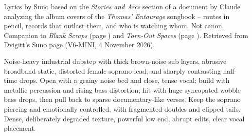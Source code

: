 
\label{sec:routes-keep-moving}
\begin{notes}
Lyrics by Suno based on the \emph{Stories and Arcs} section of a document by Claude analyzing the album covers of the \emph{Thomas' Entourage} songbook -- routes in pencil, records that outlast them, and who is watching whom. Not canon. Companion to \emph{Blank Scraps} (page \pageref{sec:blank-scraps}) and \emph{Torn-Out Spaces} (page \pageref{sec:torn-out-spaces}). Retrieved from Dvigitt's Suno page (V6-MINI, 4 November 2026).
\end{notes}
\begin{style}
Noise-heavy industrial dubstep with thick brown-noise sub layers, abrasive broadband static, distorted female soprano lead, and sharply contrasting half-time drops. Open with a grainy noise bed and close, tense vocal; build with metallic percussion and rising bass distortion; hit with huge syncopated wobble bass drops, then pull back to sparse documentary-like verses. Keep the soprano piercing and emotionally controlled, with fragmented doubles and clipped tails. Dense, deliberately degraded texture, powerful low end, abrupt edits, clear vocal placement.
\end{style}
